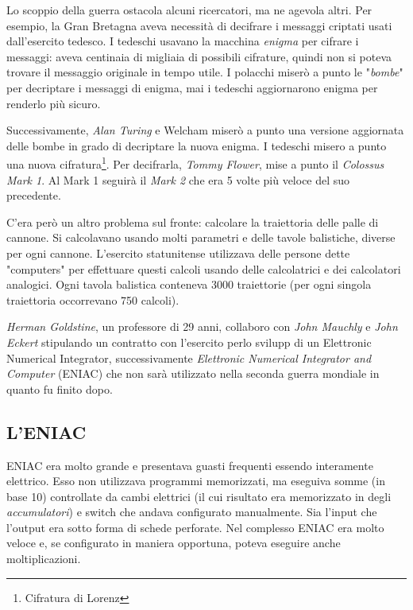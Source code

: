 Lo scoppio della guerra ostacola alcuni ricercatori, ma ne agevola altri. Per esempio, la Gran Bretagna aveva necessità di decifrare i messaggi criptati usati dall'esercito tedesco. I tedeschi usavano la macchina \textit{enigma} per cifrare i messaggi: aveva centinaia di migliaia di possibili cifrature, quindi non si poteva trovare il messaggio originale in tempo utile. I polacchi miserò a punto le "\textit{bombe}" per decriptare i messaggi di enigma, mai i tedeschi aggiornarono enigma per renderlo più sicuro.

Successivamente, \textit{Alan Turing} e Welcham miserò a punto una versione aggiornata delle bombe in grado di decriptare la nuova enigma. I tedeschi misero a punto una nuova cifratura\footnote{Cifratura di Lorenz}. Per decifrarla, \textit{Tommy Flower}, mise a punto il \textit{Colossus Mark 1}. Al Mark 1 seguirà il \textit{Mark 2} che era 5 volte più veloce del suo precedente.

C'era però un altro problema sul fronte: calcolare la traiettoria delle palle di cannone. Si calcolavano usando molti parametri e delle tavole balistiche, diverse per ogni cannone. L'esercito statunitense utilizzava delle persone dette "computers" per effettuare questi calcoli usando delle calcolatrici e dei calcolatori analogici. Ogni tavola balistica conteneva 3000 traiettorie (per ogni singola traiettoria occorrevano 750 calcoli).

\textit{Herman Goldstine}, un professore di 29 anni, collaboro con \textit{John Mauchly} e \textit{John Eckert} stipulando un contratto con l'esercito perlo svilupp di un Elettronic Numerical Integrator, successivamente \textit{Elettronic Numerical Integrator and Computer} (ENIAC) che non sarà utilizzato nella seconda guerra mondiale in quanto fu finito dopo. 

\subsection{L'ENIAC}

ENIAC era molto grande e presentava guasti frequenti essendo interamente elettrico. Esso non utilizzava programmi memorizzati, ma eseguiva somme (in base 10) controllate da cambi elettrici (il cui risultato era memorizzato in degli \textit{accumulatori}) e switch che andava configurato manualmente. Sia l'input che l'output era sotto forma di schede perforate. Nel complesso ENIAC era molto veloce e, se configurato in maniera opportuna, poteva eseguire anche moltiplicazioni.

